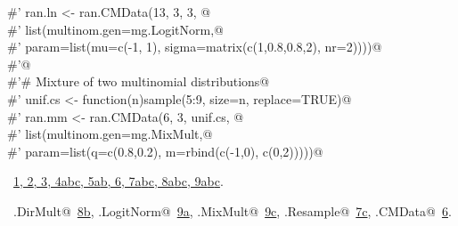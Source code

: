 \documentclass[reqno]{amsart}
\renewcommand{\NWlink}[2]{\hyperlink{#1}{#2}}
\begin{document}
\begin{flushleft}
\begin{list}{}{}
\mbox{}\verb@#' ran.ln <- ran.CMData(13, 3, 3, @\\
\mbox{}\verb@#'                      list(multinom.gen=mg.LogitNorm,@\\
\mbox{}\verb@#'                           param=list(mu=c(-1, 1), sigma=matrix(c(1,0.8,0.8,2), nr=2))))@\\
\mbox{}\verb@#'@\\
\mbox{}\verb@#'# Mixture of two multinomial distributions@\\
\mbox{}\verb@#' unif.cs <- function(n){sample(5:9, size=n, replace=TRUE)}@\\
\mbox{}\verb@#' ran.mm <- ran.CMData(6, 3, unif.cs, @\\
\mbox{}\verb@#'                      list(multinom.gen=mg.MixMult,@\\
\mbox{}\verb@#'                           param=list(q=c(0.8,0.2), m=rbind(c(-1,0), c(0,2)))))@\\
\mbox{}\verb@@{\NWsep}
\end{list}
\vspace{-1.5ex}
\footnotesize
\begin{list}{}{\setlength{\itemsep}{-\parsep}\setlength{\itemindent}{-\leftmargin}}
\item \NWtxtFileDefBy\ \NWlink{nuweb1}{1}\NWlink{nuweb2}{, 2}\NWlink{nuweb3}{, 3}\NWlink{nuweb4a}{, 4a}\NWlink{nuweb4b}{b}\NWlink{nuweb4c}{c}\NWlink{nuweb5a}{, 5a}\NWlink{nuweb5b}{b}\NWlink{nuweb6}{, 6}\NWlink{nuweb7a}{, 7a}\NWlink{nuweb7b}{b}\NWlink{nuweb7c}{c}\NWlink{nuweb8a}{, 8a}\NWlink{nuweb8b}{b}\NWlink{nuweb8c}{c}\NWlink{nuweb9a}{, 9a}\NWlink{nuweb9b}{b}\NWlink{nuweb9c}{c}.
\item \NWtxtIdentsUsed\nobreak\  \verb@mg.DirMult@\nobreak\ \NWlink{nuweb8b}{8b}, \verb@mg.LogitNorm@\nobreak\ \NWlink{nuweb9a}{9a}, \verb@mg.MixMult@\nobreak\ \NWlink{nuweb9c}{9c}, \verb@mg.Resample@\nobreak\ \NWlink{nuweb7c}{7c}, \verb@ran.CMData@\nobreak\ \NWlink{nuweb6}{6}.
\item{}
\end{list}
\vspace{4ex}
\end{flushleft}
\end{document}
